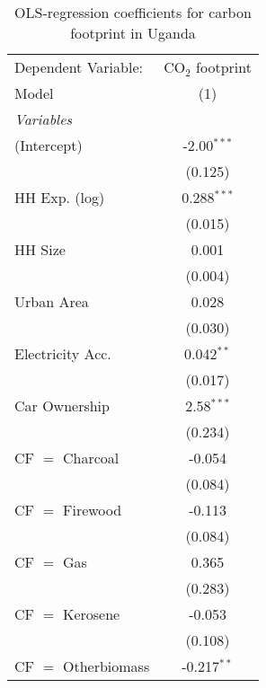 
\begin{table}[htbp!]
   \centering
   \small
   \begin{adjustbox}{width = 1\textwidth, max height = 0.95\textheight, center}
      \begin{threeparttable}[b]
         \caption{\label{tab:OLS_2_UGA} OLS-regression coefficients for carbon footprint in Uganda}
         \begin{tabular}{lc}
            \tabularnewline \midrule \midrule
            Dependent Variable: & CO$_{2}$ footprint\\  
            Model               & (1)\\  
            \midrule
            \emph{Variables}\\
            (Intercept)         & -2.00$^{***}$\\   
                                & (0.125)\\   
            HH Exp. (log)       & 0.288$^{***}$\\   
                                & (0.015)\\   
            HH Size             & 0.001\\   
                                & (0.004)\\   
            Urban Area          & 0.028\\   
                                & (0.030)\\   
            Electricity Acc.    & 0.042$^{**}$\\   
                                & (0.017)\\   
            Car Ownership       & 2.58$^{***}$\\   
                                & (0.234)\\   
            CF $=$ Charcoal     & -0.054\\   
                                & (0.084)\\   
            CF $=$ Firewood     & -0.113\\   
                                & (0.084)\\   
            CF $=$ Gas          & 0.365\\   
                                & (0.283)\\   
            CF $=$ Kerosene     & -0.053\\   
                                & (0.108)\\   
            CF $=$ Otherbiomass & -0.217$^{**}$\\   

\end{tabular}
\end{threeparttable}
\end{adjustbox}
\end{table}
